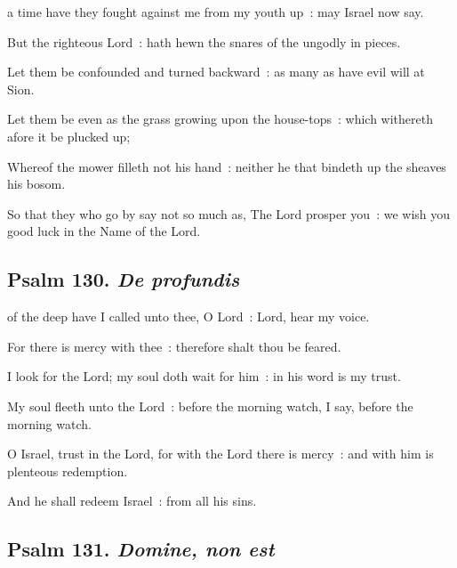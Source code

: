  a time have they fought against me from my youth up~: may Israel now say.\par
{}
But the righteous Lord~: hath hewn the snares of the ungodly in pieces.\par
{}Let them be confounded and turned backward~: as many as have evil will at Sion.\par
{}Let them be even as the grass growing upon the house-tops~: which withereth afore it be plucked up;\par
{}Whereof the mower filleth not his hand~: neither he that bindeth up the sheaves his bosom.\par
{}So that they who go by say not so much as, The Lord prosper you~: we wish you good luck in the Name of the Lord.\par


\clearpage
\subsection{Psalm 130. \textit{De profundis}}


 of the deep have I called unto thee, O Lord~: Lord, hear my voice.\par
{}
For there is mercy with thee~: therefore shalt thou be feared.\par
{}I look for the Lord; my soul doth wait for him~: in his word is my trust.\par
{}My soul fleeth unto the Lord~: before the morning watch, I say, before the morning watch.\par
{}O Israel, trust in the Lord, for with the Lord there is mercy~: and with him is plenteous redemption.\par
{}And he shall redeem Israel~: from all his sins.\par

\subsection{Psalm 131. \textit{Domine, non est}}

